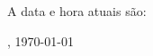 \documentclass{article}
\begin{document}
A data e hora atuais são:

\currenttime, \today
\end{document}
